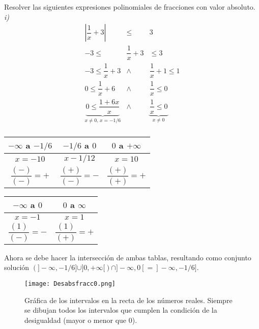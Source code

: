 \begin{myexample}
Resolver las siguientes expresiones polinomiales de fracciones con valor absoluto.\\

\noindent\textit{i)}
\begin{eqnarray*}
\left|\dfrac{1}{x}+3 \right| &\leq &3 \\
-3\leq &\dfrac{1}{x}+3& \leq 3 \\
-3\leq \dfrac{1}{x}+3 &\wedge &\dfrac{1}{x}+1 \leq 1 \\
0\leq \dfrac{1}{x}+6 &\wedge &\dfrac{1}{x} \leq 0\\
\underbrace{0\leq \dfrac{1+6x}{x}}_\text{$x\neq 0$,  $x=-1/6$} &\wedge &\underbrace{\dfrac{1}{x}\leq 0}_\text{$x\neq 0$}\\
\end{eqnarray*}

\begin{minipage}{0.5\textwidth}
\begin{tabular}{|c|c|c|}
\hline
  $-\infty$ a $-1/6$ & $-1/6$ a $0$ & $0$ a $+\infty$ \\
\hline
 $x=-10$ & $x-1/12$ & $x=10$  \\
  $\dfrac{(-)}{(-)}=+$&$\dfrac{(+)}{(-)}=-$&$\dfrac{(+)}{(+)}=+$  \\
\hline
\end{tabular}
\end{minipage}
\begin{minipage}{0.5\textwidth}
\begin{tabular}{|c|c|}
\hline
 $-\infty$ a $0$ & $0$ a $\infty$    \\
\hline
 $x=-1$&$x=1$   \\
  $\dfrac{(1)}{(-)}=-$& $\dfrac{(1)}{(+)}=+$  \\
  \hline
\end{tabular}
\end{minipage}

Ahora se debe hacer la intersección de ambas tablas, resultando como conjunto solución $\left( ]-\infty,-1/6]\cup ]0,+\infty[\right) \cap ]-\infty,0[=]-\infty,-1/6]$.\\
\begin{center}
\begin{figure}[h!]
\centering
\texttt{[image: Desabsfracc0.png]}
\caption[Gráfica de los intervalos en la recta de los números reales.]{Gráfica de los intervalos en la recta de los números reales. Siempre se dibujan todos los  intervalos que cumplen la condición de la desigualdad (mayor o menor que 0).}
\end{figure}
\end{center}


\end{myexample}
